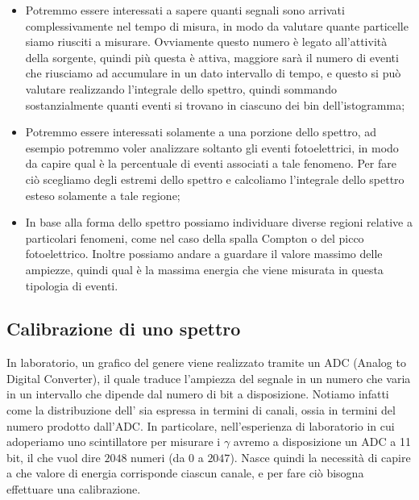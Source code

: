 \begin{itemize}[leftmargin=0.5cm]
   \item Potremmo essere interessati a sapere quanti segnali sono arrivati complessivamente nel tempo di misura, in modo da valutare quante particelle siamo riusciti a misurare. Ovviamente questo numero è legato all'attività della sorgente, quindi più questa è attiva, maggiore sarà il numero di eventi che riusciamo ad accumulare in un dato intervallo di tempo, e questo si può valutare realizzando l'integrale dello spettro, quindi sommando sostanzialmente quanti eventi si trovano in ciascuno dei bin dell'istogramma;
   \item Potremmo essere interessati solamente a una porzione dello spettro, ad esempio potremmo voler analizzare soltanto gli eventi fotoelettrici, in modo da capire qual è la percentuale di eventi associati a tale fenomeno. Per fare ciò scegliamo degli estremi dello spettro e calcoliamo l'integrale dello spettro esteso solamente a tale regione;
   \item In base alla forma dello spettro possiamo individuare diverse regioni relative a particolari fenomeni, come nel caso della spalla Compton o del picco fotoelettrico. Inoltre possiamo andare a guardare il valore massimo delle ampiezze, quindi qual è la massima energia che viene misurata in questa tipologia di eventi.
\end{itemize}

\subsection{Calibrazione di uno spettro}

In laboratorio, un grafico del genere viene realizzato tramite un ADC (Analog to Digital Converter), il quale traduce l'ampiezza del segnale in un numero che varia in un intervallo che dipende dal numero di bit a disposizione. Notiamo infatti come la distribuzione dell' sia espressa in termini di canali, ossia in termini del numero prodotto dall'ADC. In particolare, nell'esperienza di laboratorio in cui adoperiamo uno scintillatore per misurare i $\gamma$ avremo a disposizione un ADC a 11 bit, il che vuol dire $2048$ numeri (da $0$ a $2047$). Nasce quindi la necessità di capire a che valore di energia corrisponde ciascun canale, e per fare ciò bisogna effettuare una calibrazione.


